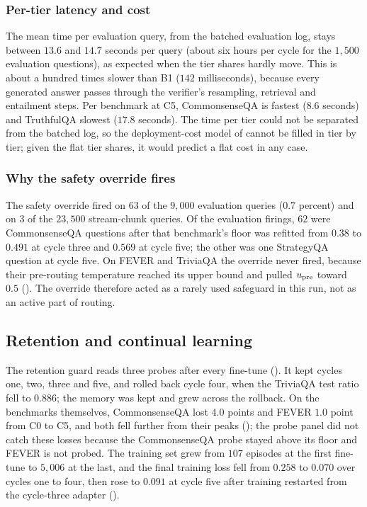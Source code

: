 



\subsubsection{Per-tier latency and cost}
\label{sec:tier-cost}

The mean time per evaluation query, from the batched evaluation log, stays between $13.6$ and $14.7$ seconds per query (about six hours per cycle for the $1{,}500$ evaluation questions), as expected when the tier shares hardly move. This is about a hundred times slower than B1 ($142$ milliseconds), because every generated answer passes through the verifier's resampling, retrieval and entailment steps. Per benchmark at C5, CommonsenseQA is fastest ($8.6$ seconds) and TruthfulQA slowest ($17.8$ seconds). The time per tier could not be separated from the batched log, so the deployment-cost model of  cannot be filled in tier by tier; given the flat tier shares, it would predict a flat cost in any case.

\subsubsection{Why the safety override fires}
\label{sec:tier-safety}

The safety override fired on $63$ of the $9{,}000$ evaluation queries ($0.7$ percent) and on $3$ of the $23{,}500$ stream-chunk queries. Of the evaluation firings, $62$ were CommonsenseQA questions after that benchmark's floor was refitted from $0.38$ to $0.491$ at cycle three and $0.569$ at cycle five; the other was one StrategyQA question at cycle five. On FEVER and TriviaQA the override never fired, because their pre-routing temperature reached its upper bound and pulled $u_{\text{pre}}$ toward $0.5$ (). The override therefore acted as a rarely used safeguard in this run, not as an active part of routing.

\FloatBarrier

\subsection{Retention and continual learning}
\label{sec:retention}

The retention guard reads three probes after every fine-tune (). It kept cycles one, two, three and five, and rolled back cycle four, when the TriviaQA test ratio fell to $0.886$; the memory was kept and grew across the rollback. On the benchmarks themselves, CommonsenseQA lost $4.0$ points and FEVER $1.0$ point from C0 to C5, and both fell further from their peaks (); the probe panel did not catch these losses because the CommonsenseQA probe stayed above its floor and FEVER is not probed. The training set grew from $107$ episodes at the first fine-tune to $5{,}006$ at the last, and the final training loss fell from $0.258$ to $0.070$ over cycles one to four, then rose to $0.091$ at cycle five after training restarted from the cycle-three adapter ().

